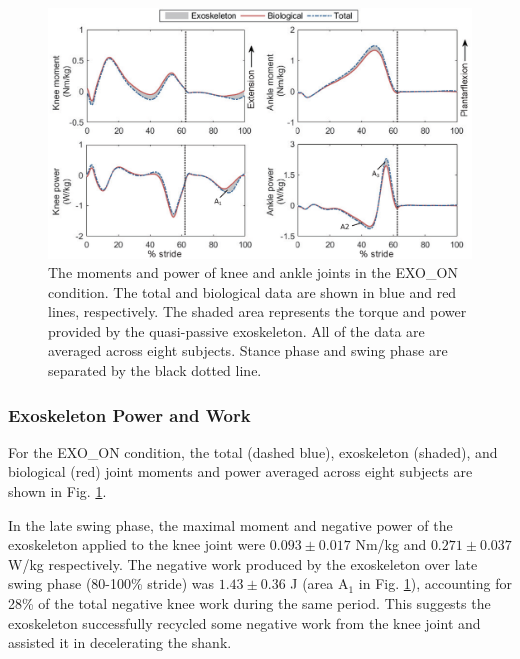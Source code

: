 \documentclass[twocolumn,cleanfoot,10pt]{asme2ej}
\begin{document}
\begin{figure}[t]
	\centering
	\includegraphics[width=17cm]{exo.eps}
	\caption{The moments and power of knee and ankle joints in the EXO\_ON condition.
	The total and biological data are shown in blue and red lines, respectively.
	The shaded area represents the torque and power provided by the quasi-passive exoskeleton.
	All of the data are averaged across eight subjects.
	Stance phase and swing phase are separated by the black dotted line.}
	\label{fig:exo}
\end{figure}

\subsubsection{Exoskeleton Power and Work}
For the EXO\_ON condition, the total (dashed blue), exoskeleton (shaded), and biological (red) joint moments and power averaged across eight subjects are shown in Fig. \ref{fig:exo}.

In the late swing phase, the maximal moment and negative power of the exoskeleton applied to the knee joint were $0.093\pm0.017$ Nm/kg and $0.271\pm0.037$ W/kg respectively.
The negative work produced by the exoskeleton over late swing phase (80-100\% stride) was $1.43\pm0.36$ J (area A$_{1}$ in Fig. \ref{fig:exo}), accounting for 28\% of the total negative knee work during the same period.
This suggests the exoskeleton successfully recycled some negative work from the knee joint and assisted it in decelerating the shank.
\end{document}
